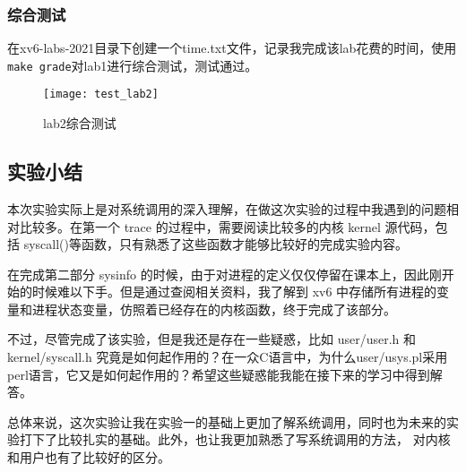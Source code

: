 \subsubsection{综合测试}

在xv6-labs-2021目录下创建一个time.txt文件，记录我完成该lab花费的时间，使用\texttt{make grade}对lab1进行综合测试，测试通过。

\begin{figure}[!htb]
	\centering
	\texttt{[image: test\_lab2]}
	\caption{lab2综合测试}
	\label{fig:test_lab2}
\end{figure}

\subsection{实验小结}

本次实验实际上是对系统调用的深入理解，在做这次实验的过程中我遇到的问题相对比较多。在第一个 trace 的过程中，需要阅读比较多的内核 kernel 源代码，包括 syscall()等函数，只有熟悉了这些函数才能够比较好的完成实验内容。

在完成第二部分 sysinfo 的时候，由于对进程的定义仅仅停留在课本上，因此刚开始的时候难以下手。但是通过查阅相关资料，我了解到 xv6 中存储所有进程的变量和进程状态变量，仿照着已经存在的内核函数，终于完成了该部分。

不过，尽管完成了该实验，但是我还是存在一些疑惑，比如 user/user.h 和 kernel/syscall.h 究竟是如何起作用的？在一众C语言中，为什么user/usys.pl采用perl语言，它又是如何起作用的？希望这些疑惑能我能在接下来的学习中得到解答。

总体来说，这次实验让我在实验一的基础上更加了解系统调用，同时也为未来的实验打下了比较扎实的基础。此外，也让我更加熟悉了写系统调用的方法， 对内核和用户也有了比较好的区分。
